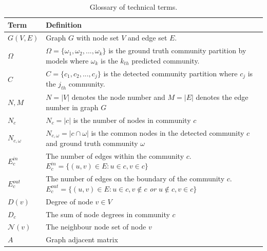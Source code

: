 \begin{table}
	\centering
	\begin{tabular}{|p{3cm}|p{11cm}|} \hline
		\textbf{Term} &  \textbf{Definition} \\ \hline
		$G(V,E)$ & Graph $G$ with node set $V$ and edge set $E$.  \\ \hline
		$\Omega$ & $\Omega = \{ \omega_1,\omega_2,..., \omega_k\}$ is the ground truth community partition by models  where $\omega_k$ is the $k_{th}$ predicted community. \\ \hline
		$C$ & $C = \{ c_1,c_2,..., c_j\}$ is the detected community partition where $c_j$ is the $j_{th}$ community.\\ \hline
		$N, M$& $N = |V|$ denotes the node number and $M = |E|$ denotes the edge number in graph $G$\\ \hline
		$N_c$& $N_c = |c|$ is the number of nodes in community $c$\\ \hline
		$N_{c,\omega}$& $N_{c,\omega} = |c \cap \omega |$ is the common nodes in the detected community $c$ and ground truth community $\omega$ \\ \hline
		$E_{c}^{in}$& The number of edges within the community $c$. $E_{c}^{in} = \{(u,v) \in E : u \in c, v \in c \}$\\ \hline
		$E_{c}^{out}$& The number of edges on the boundary of the community $c$. $E_{c}^{out} = \{(u,v) \in E : u \in c, v \notin c$ \textit{or} $ u \notin c, v \in c \} $\\ \hline
		$D(v)$& Degree of node $v \in V$ \\ \hline
		$D_c$& The sum of node degrees in community $c$ \\ \hline
		$\mathcal{N}(v)$ & The neighbour node set of node $v$ \\ \hline
		$A$ & Graph adjacent matrix \\ \hline
	\end{tabular}
	\caption{Glossary of technical terms.}
	\label{tab:c2_glossary}
	
\end{table} 
